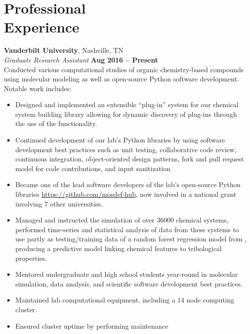 \section{\mysidestyle Professional\\Experience}

\textbf{Vanderbilt University}, Nashville, TN \vspace{2mm}\\\vspace{1mm}%
\textsl{Graduate Research Assistant} \hfill \textbf{Aug 2016 -- Present}\\
Conducted various computational studies of organic chemistry-based compounds using molecular modeling as well as open-source Python software development. Notable work includes:

\begin{itemize}[itemsep=0.5mm, parsep=2pt]
\item Designed and implemented an extensible ``plug-in'' system for our chemical system building library  allowing for dynamic discovery of plug-ins through the use of the   functionality.
\item Continued development of our lab's Python libraries by using software development best practices such as unit testing, collaborative code review, continuous integration, object-oriented design patterns, fork and pull request model for code contributions, and input sanitization 
\item Became one of the lead software developers of the lab's open-source Python libraries \url{https://github.com/mosdef-hub}, now involved in a national grant involving 7 other universities.
\item Managed and instructed the simulation of over \num{36000} chemical systems, performed time-series and statistical analysis of data from these systems to use partly as testing/training data of a random forest regression model from , producing a predictive model linking chemical features to tribological properties.
\item Mentored undergraduate and high school students year-round in molecular simulation, data analysis, and scientific software development best practices.
\item Maintained lab computational equipment, including a 14 node computing cluster.
\item Ensured cluster uptime by performing maintenance
\end{itemize}


